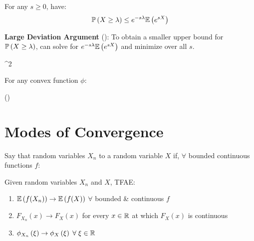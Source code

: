 \documentclass[12pt]{extarticle}
\begin{document}
\begin{corollary}
    For any $s\geq0$, have: \begin{align*}
        \mathbb{P}\left(X\geq\lambda\right)\leq e^{-s\lambda}\mathbb{E}\left(e^{sX}\right)
    \end{align*}
\end{corollary}

\newp
\textbf{Large Deviation Argument} (): To obtain a smaller upper bound for $\mathbb{P}\left(X\geq\lambda\right)$, can solve for $e^{-s\lambda}\mathbb{E}\left(e^{sX}\right)$ and minimize over all $s$.

\begin{theorem} \begin{eqnbox}
        ^2\leq{}
    \end{eqnbox}
\end{theorem}

\begin{theorem}
    For any convex function $\phi$: \begin{eqnbox}
        \phi()\leq{}
    \end{eqnbox}
\end{theorem}

\pagebreak
\section{Modes of Convergence}
\begin{definition}
    Say that random variables $X_n$  to a random variable $X$ if, $\forall$ bounded continuous functions $f$: \begin{eqnbox}
    \end{eqnbox}
\end{definition}

\begin{theorem}
    Given random variables $X_n$ and $X$, TFAE: \begin{enumerate}
        \item $\mathbb{E}\left(f(X_n)\right)\to\mathbb{E}\left(f(X)\right)$ $\forall$ bounded \& continuous $f$
        \item $F_{X_n}(x)\to F_X(x)$ for every $x\in\mathbb{R}$ at which $F_X(x)$ is continuous
        \item $\phi_{X_n}\left(\xi\right)\to\phi_{X}\left(\xi\right)\;\forall\;\xi\in\mathbb{R}$
    \end{enumerate}
\end{theorem}
\end{document}
